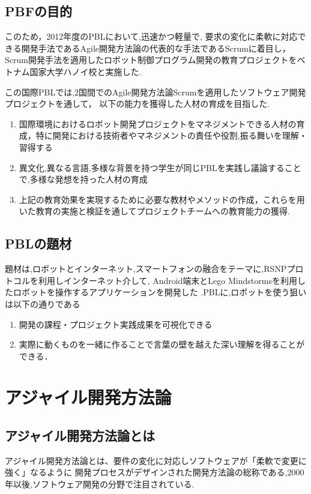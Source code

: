\documentclass[paper]{jrsj}
\begin{document}
\subsection{PBFの目的}
このため，2012年度のPBLにおいて,迅速かつ軽量で,
要求の変化に柔軟に対応できる開発手法であるAgile開発方法論の代表的な手法であるScrumに着目し，
Scrum開発手法を適用したロボット制御プログラム開発の教育プロジェクトをベトナム国家大学ハノイ校と実施した.

この国際PBLでは,2国間でのAgile開発方法論Scrumを適用したソフトウェア開発プロジェクトを通して，
以下の能力を獲得した人材の育成を目指した.

\begin{enumerate}
  \item 国際環境におけるロボット開発プロジェクトをマネジメントできる人材の育成，特に開発における技術者やマネジメントの責任や役割,振る舞いを理解・習得する
  \item 異文化,異なる言語,多様な背景を持つ学生が同じPBLを実践し議論することで,多様な発想を持った人材の育成
  \item 上記の教育効果を実現するために必要な教材やメソッドの作成，これらを用いた教育の実施と検証を通してプロジェクトチームへの教育能力の獲得.  
\end{enumerate}


\subsection{PBLの題材}

題材は,ロボットとインターネット,スマートフォンの融合をテーマに,RSNPプロトコルを利用しインターネット介して,
Android端末とLego Mindstormsを利用したロボットを操作するアプリケーションを開発した
.PBLに,ロボットを使う狙いは以下の通りである

\begin{enumerate}
  \item 開発の課程・プロジェクト実践成果を可視化できる
  \item 実際に動くものを一緒に作ることで言葉の壁を越えた深い理解を得ることができる．  
\end{enumerate}

\section{アジャイル開発方法論}
\subsection{アジャイル開発方法論とは}
アジャイル開発方法論とは、要件の変化に対応しソフトウェアが「柔軟で変更に強く」なるように
開発プロセスがデザインされた開発方法論の総称である,2000年以後,ソフトウェア開発の分野で注目されている.
\end{document}
